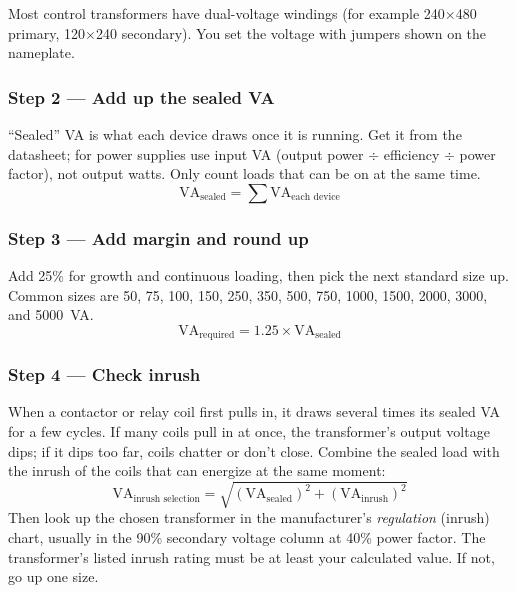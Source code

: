 Most control transformers have dual-voltage windings (for example 240$\times$480 primary, 120$\times$240 secondary). You set the voltage with jumpers shown on the nameplate.

\subsubsection*{Step 2 --- Add up the sealed VA}
``Sealed'' VA is what each device draws once it is running. Get it from the datasheet; for power supplies use input VA (output power $\div$ efficiency $\div$ power factor), not output watts. Only count loads that can be on at the same time.
\[
  \text{VA}_{\text{sealed}} = \sum \text{VA}_{\text{each device}}
\]

\subsubsection*{Step 3 --- Add margin and round up}
Add 25\% for growth and continuous loading, then pick the next standard size up. Common sizes are 50, 75, 100, 150, 250, 350, 500, 750, 1000, 1500, 2000, 3000, and 5000~VA.
\[
  \text{VA}_{\text{required}} = 1.25 \times \text{VA}_{\text{sealed}}
\]

\subsubsection*{Step 4 --- Check inrush}
When a contactor or relay coil first pulls in, it draws several times its sealed VA for a few cycles. If many coils pull in at once, the transformer's output voltage dips; if it dips too far, coils chatter or don't close. Combine the sealed load with the inrush of the coils that can energize at the same moment:
\[
  \text{VA}_{\text{inrush selection}} = \sqrt{\left(\text{VA}_{\text{sealed}}\right)^2 + \left(\text{VA}_{\text{inrush}}\right)^2}
\]
Then look up the chosen transformer in the manufacturer's \emph{regulation} (inrush) chart, usually in the 90\% secondary voltage column at 40\% power factor. The transformer's listed inrush rating must be at least your calculated value. If not, go up one size.

